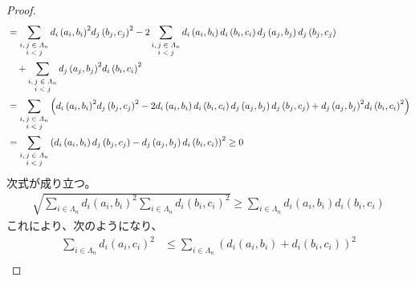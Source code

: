 \documentclass[dvipdfmx]{jsarticle}
\begin{document}
\begin{proof}
\begin{align*}
&= \sum_{\scriptsize \begin{matrix}
i,j \in \varLambda_{n} \\
i < j \\
\end{matrix}} {{d_{i}\left( a_{i},b_{i} \right)}^{2}{d_{j}\left( b_{j},c_{j} \right)}^{2}} - 2\sum_{\scriptsize \begin{matrix}
i,j \in \varLambda_{n} \\
i < j \\
\end{matrix}} {d_{i}\left( a_{i},b_{i} \right)d_{i}\left( b_{i},c_{i} \right)d_{j}\left( a_{j},b_{j} \right)d_{j}\left( b_{j},c_{j} \right)} \\
&\quad + \sum_{\scriptsize \begin{matrix}
i,j \in \varLambda_{n} \\
i < j \\
\end{matrix}} {{d_{j}\left( a_{j},b_{j} \right)}^{2}{d_{i}\left( b_{i},c_{i} \right)}^{2}}\\
&= \sum_{\scriptsize \begin{matrix}
i,j \in \varLambda_{n} \\
i < j \\
\end{matrix}} \left( {d_{i}\left( a_{i},b_{i} \right)}^{2}{d_{j}\left( b_{j},c_{j} \right)}^{2} - 2d_{i}\left( a_{i},b_{i} \right)d_{i}\left( b_{i},c_{i} \right)d_{j}\left( a_{j},b_{j} \right)d_{j}\left( b_{j},c_{j} \right) + {d_{j}\left( a_{j},b_{j} \right)}^{2}{d_{i}\left( b_{i},c_{i} \right)}^{2} \right)\\
&= \sum_{\scriptsize \begin{matrix}
i,j \in \varLambda_{n} \\
i < j \\
\end{matrix}} \left( d_{i}\left( a_{i},b_{i} \right)d_{j}\left( b_{j},c_{j} \right) - d_{j}\left( a_{j},b_{j} \right)d_{i}\left( b_{i},c_{i} \right) \right)^{2} \geq 0
\end{align*}
次式が成り立つ。
\begin{align*}
\sqrt{\sum_{i \in \varLambda_{n}} {d_{i}\left( a_{i},b_{i} \right)}^{2}\sum_{i \in \varLambda_{n}} {d_{i}\left( b_{i},c_{i} \right)}^{2}} \geq \sum_{i \in \varLambda_{n}} {d_{i}\left( a_{i},b_{i} \right)d_{i}\left( b_{i},c_{i} \right)}
\end{align*}
これにより、次のようになり、
\begin{align*}
\sum_{i \in \varLambda_{n}} {d_{i}\left( a_{i},c_{i} \right)}^{2} &\leq \sum_{i \in \varLambda_{n}} \left( d_{i}\left( a_{i},b_{i} \right) + d_{i}\left( b_{i},c_{i} \right) \right)^{2}\\

\end{align*}
\end{proof}
\end{document}
